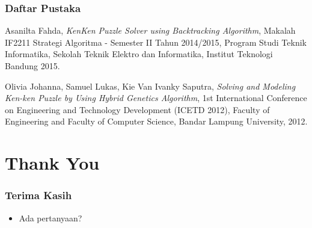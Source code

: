 \documentclass{beamer}
\begin{document}
\begin{frame}
\frametitle{Daftar Pustaka}
\begin{thebibliography}{9}
  Asanilta Fahda,
  \emph{KenKen Puzzle Solver using Backtracking Algorithm},
  Makalah IF2211 Strategi Algoritma - Semester II Tahun 2014/2015,
  Program Studi Teknik Informatika, Sekolah Teknik Elektro dan Informatika, Institut Teknologi Bandung
  2015.

  Olivia Johanna, Samuel Lukas, Kie Van Ivanky Saputra,
  \emph{Solving and Modeling Ken-ken Puzzle by Using Hybrid Genetics Algorithm},
  1st International Conference on Engineering and Technology Development (ICETD 2012),
  Faculty of Engineering and Faculty of Computer Science, Bandar Lampung University,
  2012.
\end{thebibliography}
\end{frame}

\note{

}

\section{Thank You}

\begin{frame}
\frametitle{Terima Kasih}
\begin{itemize}
\item Ada pertanyaan?
\end{itemize}
\end{frame}

\note{

}
\end{document}

